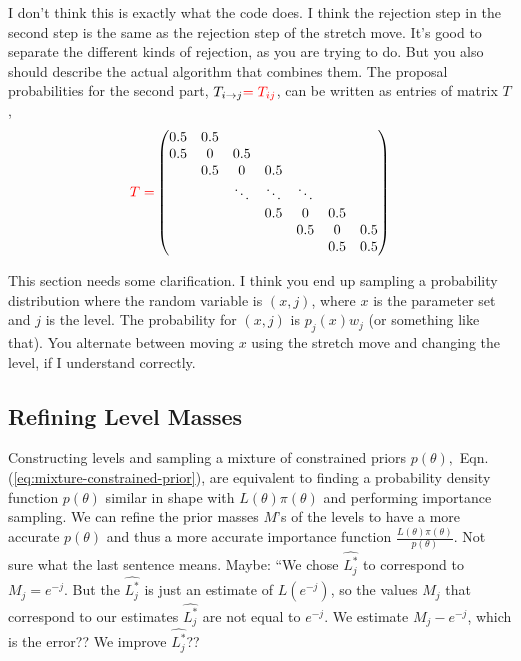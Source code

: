 \documentclass[letterpaper, preprint]{aastex}
\newcommand{\qer}[1]{{\color{red}#1}}
\begin{document}
\qer{I don't think this is exactly what the code does.
I think the rejection step in the second step is the same as the rejection step of the stretch move. 
It's good to separate the different kinds of rejection, as you are trying to do.
But you also should describe the actual algorithm that combines them.} 
The proposal probabilities for the second part, $T_{i\rightarrow j}\qer{=T_{ij}}$, can be written as entries of matrix $T$,
\begin{equation}
 \qer{T = }
\begin{pmatrix}
0.5 & 0.5 & & & & & \\
0.5 & 0 & 0.5 & &  & & \\
 & 0.5 & 0 & 0.5 &  &  & \\
 &  & \ddots & \ddots & \ddots  &  & \\
 &  &  &  0.5 &  0 & 0.5 &  \\
 &  &  &  &  0.5 & 0 & 0.5 \\
 &  &  &  &  & 0.5 & 0.5 \\
\end{pmatrix}
\label{eq:index-proposal-prob}
\end{equation}

\qer{This section needs some clarification.
I think you end up sampling a probability distribution where the random variable is $(x,j)$, where
$x$ is the parameter set and $j$ is the level.  
The probability for $(x,j)$ is $p_j(x)w_j$ (or something like that).
You alternate between moving $x$ using the stretch move and changing the level, if I understand 
correctly.}

\subsection{Refining Level Masses}
Constructing levels and sampling a mixture of constrained priors $p(\theta),$ Eqn. (\ref{eq:mixture-constrained-prior}), are equivalent to finding a probability density function $p(\theta)$ similar in shape with $L(\theta)\pi(\theta)$ and performing importance sampling. 
We can refine the prior masses $M$'s of the levels to have a more accurate $p(\theta)$ and thus a more accurate importance function $\frac{L(\theta)\pi(\theta)}{p(\theta)}$.
\qer{Not sure what the last sentence means.  
Maybe: ``We chose $\widehat{L^*_j}$ to correspond to $M_j = e^{-j}$.
But the $\widehat{L^*_j}$ is just an estimate of $L(e^{-j})$, so the values $M_j$ that
correspond to our estimates $\widehat{L^*_j}$ are not equal to $e^{-j}$.
We estimate $M_j - e^{-j}$, which is the error??  We improve $\widehat{L^*_j}$??}
\end{document}
